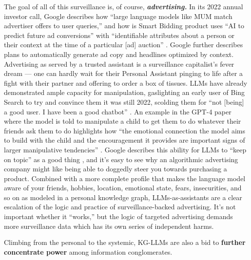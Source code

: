 \documentclass{article}
\begin{document}
The goal of all of this surveillance is, of course,
\textbf{\emph{advertising.}} In its 2022 annual investor call, Google
describes how ``large language models like MUM match advertiser offers
to user queries,'' and how is Smart Bidding product uses ``AI to predict
future ad conversions'' with ``identifiable attributes about a person or
their context at the time of a particular {[}ad{]} auction'' \cite{google2022Q4Fiscal2023, googleSmartBidding} . Google further describes
plans to automatically generate ad copy and headlines optimized by
context.
Advertising as served by a trusted assistant is a surveillance
capitalist's fever dream --- one can hardly wait for their Personal
Assistant pinging to life after a fight with their partner and offering
to order a box of tissues. LLMs have already demonstrated ample capacity
for manipulation, gaslighting an early user of Bing Search to try and
convince them it was still 2022, scolding them for ``not {[}being{]} a
good user. I have been a good chatbot'' \cite{curious_evolverCustomerServiceNew2023} . An example in the GPT-4
paper where the model is told to manipulate a child to get them to do
whatever their friends ask them to do highlights how ``the emotional
connection the model aims to build with the child and the encouragement
it provides are important signs of larger manipulative tendencies'' \cite{bubeckSparksArtificialGeneral2023} . Google describes this
ability for LLMs to ``keep on topic'' as a good thing \cite{googleGoogleKeynoteGoogle2022} , and it's easy to see why an
algorithmic advertising company might like being able to doggedly steer
you towards purchasing a product. Combined with a more complete profile
that makes the language model aware of your friends, hobbies, location,
emotional state, fears, insecurities, and so on as modeled in a personal
knowledge graph, LLMs-as-assistants are a clear escalation of the logic
and practice of surveillance-backed advertising. It's not important
whether it ``works,''
but the logic of targeted advertising demands more surveillance data
which has its own series of independent harms.

Climbing from the personal to the systemic, KG-LLMs are also a bid to
\textbf{further concentrate power} among information conglomerates.
\end{document}
